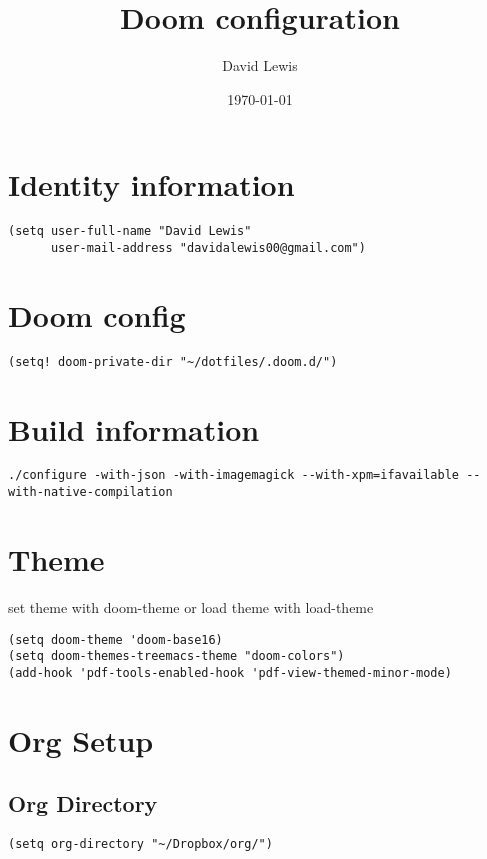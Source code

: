 \documentclass[11pt]{article}
\author{David Lewis}
\date{\today}
\title{Doom configuration}
\begin{document}
\maketitle
\tableofcontents

\section{Identity information}
\label{sec:org3638e69}
\begin{verbatim}
(setq user-full-name "David Lewis"
      user-mail-address "davidalewis00@gmail.com")
\end{verbatim}
\section{Doom config}
\label{sec:orgb7df7ec}
\begin{verbatim}
(setq! doom-private-dir "~/dotfiles/.doom.d/")
\end{verbatim}
\section{Build information}
\label{sec:org2f82f22}
\begin{verbatim}
./configure -with-json -with-imagemagick --with-xpm=ifavailable --with-native-compilation
\end{verbatim}
\section{Theme}
\label{sec:org3aa0827}
set theme with doom-theme or load theme with load-theme
\begin{verbatim}
(setq doom-theme 'doom-base16)
(setq doom-themes-treemacs-theme "doom-colors")
(add-hook 'pdf-tools-enabled-hook 'pdf-view-themed-minor-mode)
\end{verbatim}
\section{Org Setup}
\label{sec:org16cfd73}
\subsection{Org Directory}
\label{sec:org61f7b7f}
\begin{verbatim}
(setq org-directory "~/Dropbox/org/")
\end{verbatim}
\end{document}
